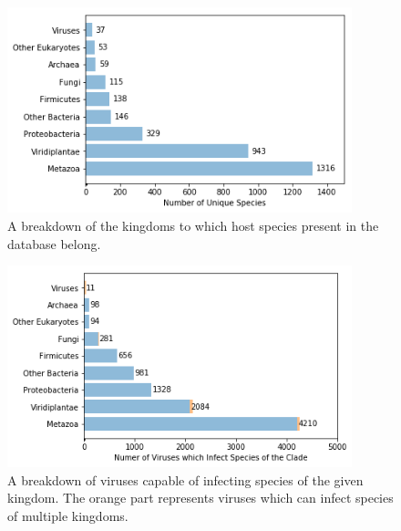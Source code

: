 \documentclass[12pt]{article}
\begin{document}
    \begin{figure}[H]
        \begin{center}
            \includegraphics[width=100mm]{host_clades_figure.png}
            \caption{A breakdown of the kingdoms to which host species present in
            the database belong.}
            \label{host_clades_figure}
        \end{center}
    \end{figure}
    \begin{figure}[H]
        \begin{center}
            \includegraphics[width=100mm]{infects_clades_figure.png}
            \caption{A breakdown of viruses capable of infecting species of
            the given kingdom. The orange part represents viruses which can
            infect species of multiple kingdoms.}
            \label{infects_clades_figure}
        \end{center}
    \end{figure}
    
\end{document}
